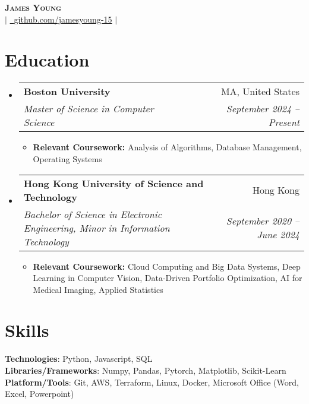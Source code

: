 \documentclass[letterpaper,11pt]{article}
\makeatletter
\newcommand{\resumeItem}[1]{
  \item\small{
    {#1 \vspace{-2pt}}
  }
}
\newcommand{\resumeSubheading}[4]{
  \vspace{-2pt}\item
    \begin{tabular*}{0.97\textwidth}[t]{l@{\extracolsep{\fill}}r}
      \textbf{#1} & #2 \\
      \textit{\small#3} & \textit{\small #4} \\
    \end{tabular*}\vspace{-7pt}
}
\newcommand{\resumeSubHeadingListStart}{\begin{itemize}[leftmargin=0.08in, label={}]}
\newcommand{\resumeSubHeadingListEnd}{\end{itemize}}
\newcommand{\resumeItemListStart}{\begin{itemize}[leftmargin=0.22in]}
\newcommand{\resumeItemListEnd}{\end{itemize}\vspace{-5pt}}
\makeatother
\begin{document}
\begin{center}
    \textbf{\Huge \scshape James Young} \\ \vspace{1pt}
    \small 
    \href{mailto:jamesyoung3931@gmail.com}{} $|$
    \href{https://github.com/jamesyoung-15} {\faGithub\ {github.com/jamesyoung-15}} $|$
    \href{https://jyyoung.com}{}
\end{center}


\section{Education}
  \resumeSubHeadingListStart
    \resumeSubheading
        {Boston University}{MA, United States}
        {Master of Science in Computer Science}{September 2024 -- Present}
        \resumeItemListStart
            \resumeItem{\textbf{Relevant Coursework:} Analysis of Algorithms, Database Management, Operating Systems}
        \resumeItemListEnd
    \resumeSubheading
        {Hong Kong University of Science and Technology}{Hong Kong}
        {Bachelor of Science in Electronic Engineering, Minor in Information Technology}{September 2020 -- June 2024}
        \resumeItemListStart
            \resumeItem{\textbf{Relevant Coursework:} Cloud Computing and Big Data Systems, Deep Learning in Computer Vision, Data-Driven Portfolio Optimization, AI for Medical Imaging, Applied Statistics}
        \resumeItemListEnd
  \resumeSubHeadingListEnd


\section{Skills}
 \begin{itemize}[leftmargin=0.08in, label={}]
    \small{\item{
     \textbf{Technologies}{: Python, Javascript, SQL} \\
     \textbf{Libraries/Frameworks}{: Numpy, Pandas, Pytorch, Matplotlib, Scikit-Learn } \\
     \textbf{Platform/Tools}{: Git, AWS, Terraform, Linux, Docker, Microsoft Office (Word, Excel, Powerpoint)} \\
    }}
 \end{itemize}
\end{document}
